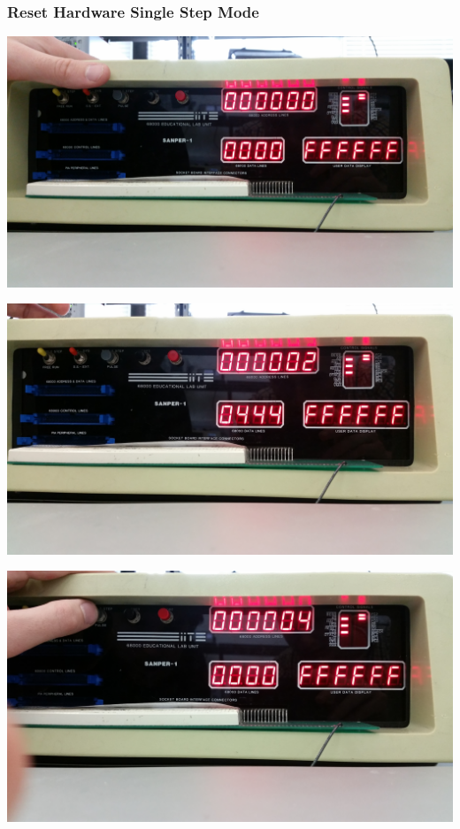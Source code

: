 \documentclass[12pt, twocolumn]{article}
\begin{document}
\subsubsection{Reset Hardware Single Step Mode}
\label{resetpic}
\begin{center}
\includegraphics[width=1\linewidth]{Lab1/20150120_094935}
\end{center}
\begin{center}
\includegraphics[width=1\linewidth]{Lab1/20150120_094945}
\end{center}
\begin{center}
\includegraphics[width=1\linewidth]{Lab1/20150120_095003}
\end{center}
\end{document}

